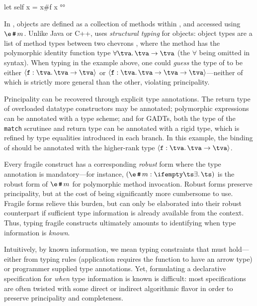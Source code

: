 \documentclass[acmsmall,screen,nonacm%
\Anonymous{,anonymous}{}%
\Final{}{,review}%
]{acmart}
\begin{document}
\vspace{1ex}
\begin{program}[input]
let self x = x#f x °°
\end{program}

In \OCaml, objects are defined as a collection of methods within
, and accessed using $\e \esend m$. Unlike Java or C++,
\OCaml uses \emph{structural typing} for objects: object types are a list of
method types between two chevrons \eg {},
where the method  has the polymorphic identity function type
$\all \tv {\tv \to \tv}$ (the $\forall$ being omitted in \OCaml syntax).
%
When typing  in the example above, one could \emph{guess} the type
of  to be either $\epolymeth f \tv {\tv \to \tv}$ or $\epolymeth f \tv
{\tv \to \tv \to \tv}$---neither of which is strictly more general than the
other, violating principality.


Principality can be recovered through explicit type annotations. The return
type of overloaded datatype constructors may be annotated; polymorphic
expressions can be annotated with a type scheme; and for GADTs, both the type
of the \texttt{match} scrutinee and return type can be annotated with a rigid
type, which is refined by type equalities introduced in each branch.
In this example, the binding of  should be annotated with the
higher-rank type $\epolymeth f \tv {\tv \to \tv}$.


Every fragile construct has a corresponding \emph{robust} form where the type
annotation is mandatory---for instance, $\eannot {\e \esend m} {} \ts$ is the
robust form of $\e \esend  m$ for polymorphic method invocation.  Robust forms
preserve principality, but at the cost of being significantly more cumbersome
to use. Fragile forms relieve this burden, but can only be elaborated into
their robust counterpart if sufficient type information is already available
from the context. Thus, typing fragile constructs ultimately amounts to
identifying when type information is \emph{known}.



Intuitively, by known information, we mean typing constraints that
must hold---either from typing rules (\eg application requires the
function to have an arrow type) or programmer supplied type annotations. Yet,
formulating a declarative specification for \emph{when} type information is
known is difficult: most specifications are often twisted with some direct or
indirect algorithmic flavor in order to preserve principality and completeness.
\end{document}
